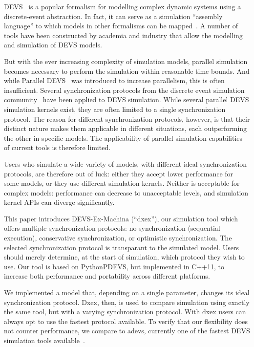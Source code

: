 \textsf{DEVS}~\cite{ClassicDEVS} is a popular formalism for modelling complex dynamic systems using a discrete-event abstraction.
In fact, it can serve as a simulation ``assembly language'' to which models in other formalisms can be mapped~\cite{DEVSbase}.
A number of tools have been constructed by academia and industry that allow the modelling and simulation of \textsf{DEVS} models.

But with the ever increasing complexity of simulation models, parallel simulation becomes necessary to perform the simulation within reasonable time bounds.
And while \textsf{Parallel DEVS}~\cite{ParallelDEVS} was introduced to increase parallelism, this is often insufficient.
Several synchronization protocols from the discrete event simulation community~\cite{FujimotoBook} have been applied to \textsf{DEVS} simulation.
While several parallel \textsf{DEVS} simulation kernels exist, they are often limited to a single synchronization protocol.
The reason for different synchronization protocols, however, is that their distinct nature makes them applicable in different situations, each outperforming the other in specific models.
The applicability of parallel simulation capabilities of current tools is therefore limited.

Users who simulate a wide variety of models, with different ideal synchronization protocols, are therefore out of luck:
either they accept lower performance for some models, or they use different simulation kernels.
Neither is acceptable for complex models: performance can decrease to unacceptable levels, and simulation kernel APIs can diverge significantly.

This paper introduces DEVS-Ex-Machina (``dxex''), our simulation tool which offers multiple synchronization protocols: no synchronization (sequential execution), conservative synchronization, or optimistic synchronization.
The selected synchronization protocol is transparant to the simulated model.
Users should merely determine, at the start of simulation, which protocol they wish to use.
Our tool is based on PythonPDEVS, but implemented in C++11, to increase both performance and portability across different platforms.

We implemented a model that, depending on a single parameter, changes its ideal synchronization protocol.
Dxex, then, is used to compare simulation using exactly the same tool, but with a varying synchronization protocol. With dxex users can always opt to use the fastest protocol available.
To verify that our flexibility does not counter performance, we compare to adevs, currently one of the fastest \textsf{DEVS} simulation tools available~\cite{PythonPDEVS,DEVSSurvey}.

